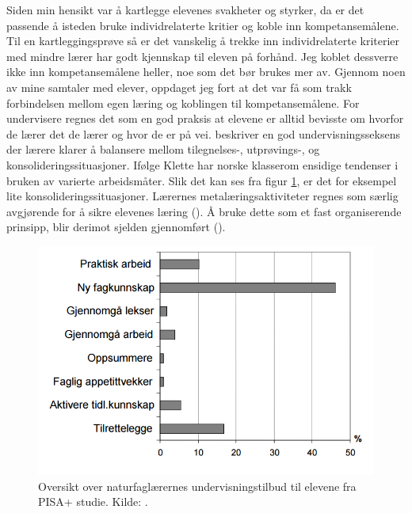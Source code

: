 \documentclass[main.tex]{subfiles}
\begin{document}
Siden min hensikt var å kartlegge elevenes svakheter og styrker, da er det passende å isteden bruke
individrelaterte kritier  og koble inn kompetansemålene. Til en kartleggingsprøve så er det vanskelig å trekke inn 
individrelaterte kriterier med mindre lærer har godt kjennskap til eleven på forhånd. Jeg koblet dessverre ikke inn 
kompetansemålene heller, noe som det bør brukes mer av. Gjennom noen av mine samtaler med elever, oppdaget jeg fort at 
det var få som trakk forbindelsen mellom egen læring og koblingen til kompetansemålene. For undervisere regnes det som 
en god praksis at elevene er alltid bevisste om hvorfor de lærer det de lærer og hvor de er på vei. 
 beskriver en god undervisningsseksens der lærere klarer å balansere mellom tilegnelses-, 
utprøvings-, og konsolideringssituasjoner. Ifølge Klette har norske klasserom ensidige tendenser i bruken av varierte 
arbeidsmåter. Slik det kan ses fra figur \ref{fig:odeg10}, er det for eksempel lite konsolideringssituasjoner. Lærernes 
metalæringsaktiviteter regnes som særlig avgjørende for å sikre elevenes læring (). Å bruke 
dette som et fast organiserende prinsipp, blir derimot sjelden gjennomført ().
\begin{figure}[h!]
\includegraphics[scale = 0.6]{../figures/undervisnings_aktivitet.png}
\caption{Oversikt over naturfaglærernes undervisningstilbud til elevene fra PISA+ studie. Kilde: 
\protect{}.}
\label{fig:odeg10}
\end{figure}
\newline
\end{document}
